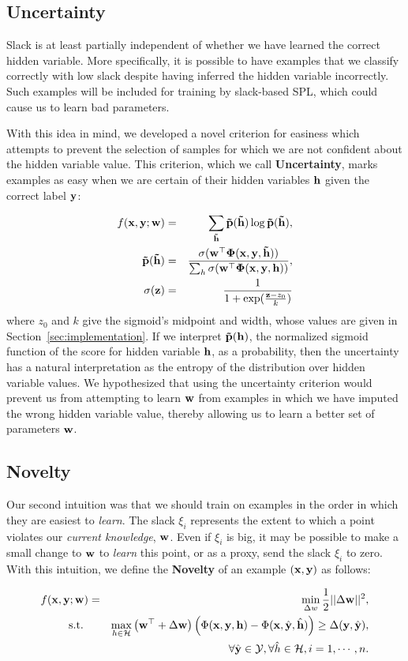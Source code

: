 \documentclass{article}
\newcommand{\mysubsection}[1]{\vspace{-3mm}\subsection{#1}\vspace{-3mm}}
\begin{document}
\mysubsection{Uncertainty}

Slack is at least partially independent of whether we have learned the correct hidden variable. More specifically, it is possible to have examples that we classify correctly with low slack despite having inferred the hidden variable incorrectly. Such examples will be included for training by slack-based SPL, which could cause us to learn bad parameters. 

With this idea in mind, we developed a novel criterion for easiness which attempts to prevent the selection of samples for which we are not confident about the hidden variable value. This criterion, which we call \textbf{Uncertainty}, marks examples as easy when we are certain of their hidden variables $\bf h$ given the correct label $\bf y$: 

\begin{eqnarray}
f(\bf x, \bf y; \bf w) &=& \sum_{\bf\tilde{h}} \bf\tilde p({\tilde h}) \log\bf\tilde p(\bf{\tilde h}), \nonumber  \\
\bf{\tilde{p}(\tilde h)} &=&\frac{\sigma(\bf{w}^\top\Phi(\bf x,y, \tilde h))}{\sum_{h}\sigma(\bf w^\top\Phi(\bf x,\bf y,\bf h))}, \nonumber \\
\sigma(\bf z) &=& \frac{1}{1+\exp(\frac{{\bf z} - z_0}{k})}
\label{eq:uncertainty}
\end{eqnarray}
where $z_0$ and $k$ give the sigmoid's midpoint and width, whose values are given in Section~\ref{sec:implementation}. If we interpret $\bf\tilde p(\bf h)$, the normalized sigmoid function of the score for hidden variable $\bf h$, as a probability, then the uncertainty has a natural interpretation as the entropy of the distribution over hidden variable values. We hypothesized that using the uncertainty criterion would prevent us from attempting to learn $\bf w$ from examples in which we have imputed the wrong hidden variable value, thereby allowing us to learn a better set of parameters $\bf w$. 

\mysubsection{Novelty}
Our second intuition was that we should train on examples in the order in which they are easiest to \emph{learn}.  The slack $\xi_i$ represents the extent to which a point violates our \emph{current knowledge}, $\bf w$.  Even if $\xi_i$ is big, it may be possible to make a small change to $\bf w$ to \emph{learn} this point, or as a proxy, send the slack $\xi_i$ to zero.  With this intuition, we define the \textbf{Novelty} of an example $(\bf x, \bf y)$ as follows:

\begin{eqnarray}
f(\bf x, \bf y; \bf w) &=&\min_{\Delta w} \frac{1}{2}||{\Delta\bf w}||^2, \nonumber \\
\mbox{s.t. } && \max_{h \in {\cal H}} \left( {\bf w}^\top + \Delta\bf w \right) \left(\Phi({\bf x},{\bf y},{\bf h}) - 
		\Phi({\bf x},\hat{\bf y},\hat{\bf h}) \right)
	 \geq \Delta({\bf y},\hat{\bf y}) , \nonumber \\
&&\forall \hat{\bf y} \in {\cal Y}, \forall \hat{h} \in {\cal H}, i=1,\cdots,n.
\label{eq:novelty}
\end{eqnarray}
\end{document}
